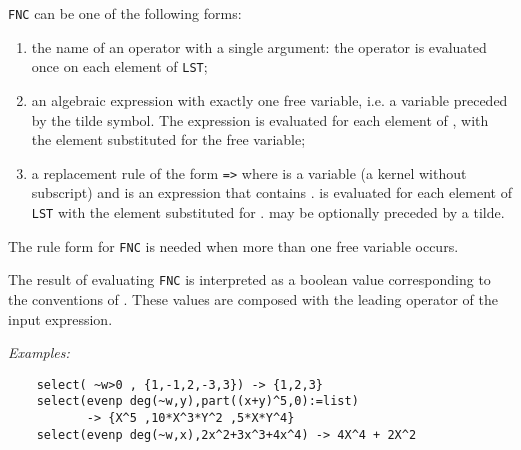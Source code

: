 \texttt{FNC} can be one of the following forms:
\begin{enumerate}
\item the name of an operator with a single argument: the operator
is evaluated once on each element of \texttt{LST};
\item an algebraic expression with exactly one free variable, i.e.
a variable preceded by the tilde symbol. The expression
is evaluated for each element of , with the element
substituted for the free variable;
\item a replacement rule of the form  \texttt{=>} 
where  is a variable (a kernel without subscript)
and  is an expression that contains .
 is evaluated for each element of \texttt{LST} with
the element substituted for  .  may be
optionally preceded by a tilde.
\end{enumerate}
The rule form  for \texttt{FNC} is needed when more than
one free variable occurs.

The result of evaluating \texttt{FNC} is
interpreted as a boolean value corresponding to the conventions of
\REDUCE. These values are composed with the leading operator of the
input expression.

\textit{Examples:}\nopagebreak
\begin{verbatim}
    select( ~w>0 , {1,-1,2,-3,3}) -> {1,2,3}
    select(evenp deg(~w,y),part((x+y)^5,0):=list)
           -> {X^5 ,10*X^3*Y^2 ,5*X*Y^4}
    select(evenp deg(~w,x),2x^2+3x^3+4x^4) -> 4X^4 + 2X^2
\end{verbatim}
